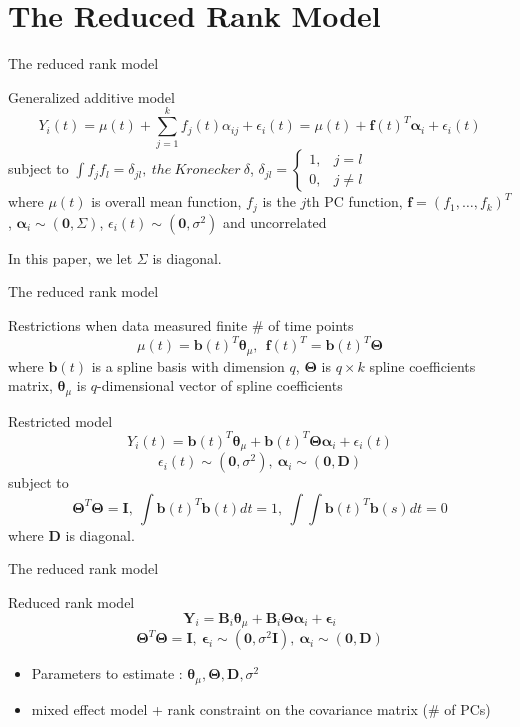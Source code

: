 \documentclass{beamer}
\def \bY {\mathbf{Y}}
\def \btheta {\boldsymbol{\theta}}
\def \bTheta {\boldsymbol{\Theta}}
\def \bepsilon {\boldsymbol{\epsilon}}
\def \balpha {\boldsymbol{\alpha}}
\begin{document}
\section{The Reduced Rank Model}
\begin{frame}{The reduced rank model}
	\begin{block}{Generalized additive model}
		$$ Y_i(t)=\mu(t)+\sum_{j=1}^k f_j(t)\alpha_{ij}+\epsilon_i(t) = \mu(t)+\boldsymbol{f}(t)^T\balpha_i + \epsilon_i(t) $$
		subject to $\int f_jf_l=\delta_{jl}, \ the\ Kronecker \ \delta$, 
		$ \delta_{jl}=
		\begin{cases}
			1, & j=l \\
			0, & j \ne l
		\end{cases} $\\
		\vspace{0.3cm}
		where $\mu(t)$ is overall mean function, $f_j$ is the $j$th PC function, $\boldsymbol{f}=(f_1,\dots,f_k)^T$, $\balpha_i \sim (\mathbf{0},\Sigma)$, $\epsilon_i(t) \sim (\mathbf{0}, \sigma^2)$ and uncorrelated
	\end{block}

	In this paper, we let $\Sigma$ is diagonal.
\end{frame}

\begin{frame}{The reduced rank model}
	\begin{block}{Restrictions when data measured finite \# of time points}
		$$ \mu(t)=\mathbf{b}(t)^T\btheta_{\mu}, \ \ \boldsymbol{f}(t)^T=\mathbf{b}(t)^T\bTheta $$
		where $\mathbf{b}(t)$ is a spline basis with dimension $q$, $\bTheta$ is $q \times k$ spline coefficients matrix, $\btheta_{\mu}$ is $q$-dimensional vector of spline coefficients
	\end{block}
	\begin{block}{Restricted model}
		$$ Y_i(t)=\mathbf{b}(t)^T\btheta_{\mu}+\mathbf{b}(t)^T\bTheta\balpha_i + \epsilon_i(t) $$
		$$ \epsilon_i(t) \sim (\mathbf{0},\sigma^2), \ \balpha_i \sim (\mathbf{0}, \mathbf{D}) $$
		subject to
		$$ \bTheta^T \bTheta=\mathbf{I}, \ \int \mathbf{b}(t)^T\mathbf{b}(t)dt=1, \ \int\int \mathbf{b}(t)^T\mathbf{b}(s)dt=0 $$
		where $\mathbf{D}$ is diagonal.
	\end{block}	
\end{frame}

\begin{frame}{The reduced rank model}
	\begin{block}{Reduced rank model}
		$$ \bY_i=\mathbf{B}_i\btheta_{\mu}+\mathbf{B}_i\bTheta\balpha_i + \bepsilon_i $$
		$$ \bTheta^T \bTheta=\mathbf{I}, \ \bepsilon_i \sim (\mathbf{0}, \sigma^2 \mathbf{I}), \ \balpha_i \sim (\mathbf{0}, \mathbf{D}) $$
	\end{block}	
	\begin{itemize}
		\item {
			Parameters to estimate : $\btheta_{\mu}, \bTheta, \mathbf{D}, \sigma^2$
		}
		\item {
			mixed effect model + rank constraint on the covariance matrix (\# of PCs)
		}
	\end{itemize}
\end{frame}
\end{document}
